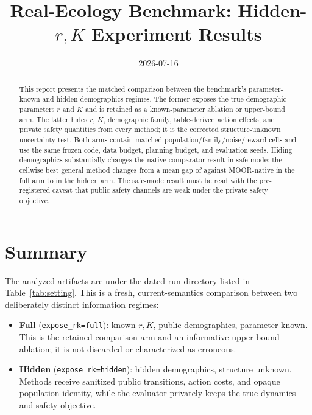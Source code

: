\documentclass[11pt]{article}
\title{Real-Ecology Benchmark: Hidden-$r,K$ Experiment Results}
\author{}
\date{2026-07-16}
\begin{document}

\maketitle

\begin{abstract}
This report presents the matched comparison between the benchmark's
parameter-known and hidden-demographics regimes.  The former exposes the true
demographic parameters $r$ and $K$ and is retained as a known-parameter
ablation or upper-bound arm.  The latter hides $r$, $K$, demographic family,
table-derived action effects, and private safety quantities from every method;
it is the corrected structure-unknown uncertainty test.  Both arms contain
\ReportMatchedCells{} matched population/family/noise/reward cells and use the
same frozen code, data budget, planning budget, and evaluation seeds.  Hiding
demographics substantially changes the native-comparator result in safe mode:
the cellwise best general method changes from a mean gap of
\SafeFullMoorGap{} against MOOR-native in the full arm to
\SafeHiddenMoorGap{} in the hidden arm.  The safe-mode result must be read
with the pre-registered caveat that public safety channels are weak under the
private safety objective.
\end{abstract}

\section{Summary}

The analyzed artifacts are under the dated run directory listed in
Table~\ref{tab:setting}.  This is a fresh, current-semantics comparison between
two deliberately distinct information regimes:
\begin{itemize}
    \item \textbf{Full} (\texttt{expose\_rk=full}): known $r,K$,
    public-demographics, parameter-known.  This is the retained comparison
    arm and an informative upper-bound ablation; it is not discarded or
    characterized as erroneous.
    \item \textbf{Hidden} (\texttt{expose\_rk=hidden}): hidden demographics,
    structure unknown.  Methods receive sanitized public transitions, action
    costs, and opaque population identity, while the evaluator privately keeps
    the true dynamics and safety objective.
\end{itemize}
\end{document}
